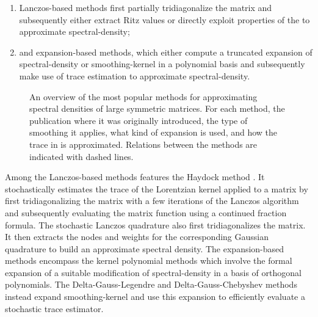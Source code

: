 \begin{enumerate}
    \item Lanczos-based methods first partially tridiagonalize the matrix and
    subsequently either extract Ritz values or directly exploit properties of the
     to approximate \gls{spectral-density};
    \item and expansion-based methods, which either compute a truncated expansion of
    \gls{spectral-density} or \gls{smoothing-kernel} in a polynomial basis and subsequently
    make use of trace estimation to approximate \gls{spectral-density}.
\end{enumerate}

\begin{figure}[ht]
    \centering
    
    \caption{An overview of the most popular methods for approximating
        spectral densities of large symmetric matrices. For each method, the publication
        where it was originally introduced, the type of smoothing it applies,
        what kind of expansion is used, and how the trace in
         is approximated.
        Relations between the methods are indicated with dashed lines.}
    \label{fig:1-introduction-literature-overview}
\end{figure}

Among the Lanczos-based methods features the Haydock method \cite{haydock1972electronic, lin2016review}.
It stochastically estimates the trace of the Lorentzian kernel applied to a matrix
by first tridiagonalizing the matrix with a few iterations of the Lanczos algorithm
\cite{lanczos1950iteration} and subsequently evaluating the matrix function using
a continued fraction formula. The stochastic Lanczos quadrature \cite{lin2016review, ubaru2017lanczos,chen2021slq}
also first tridiagonalizes the matrix. It then extracts the nodes and weights
for the corresponding Gaussian quadrature to build an approximate spectral density.
The expansion-based methods encompass the kernel polynomial methods \cite{silver1994kpm, wang1994kpm, weisse2006kpm}
which involve the formal expansion of a suitable modification of \gls{spectral-density}
in a basis of orthogonal polynomials. The Delta-Gauss-Legendre \cite{lin2016review}
and Delta-Gauss-Chebyshev \cite{lin2017randomized} methods instead expand \gls{smoothing-kernel}
and use this expansion to efficiently evaluate a stochastic trace estimator.\\

